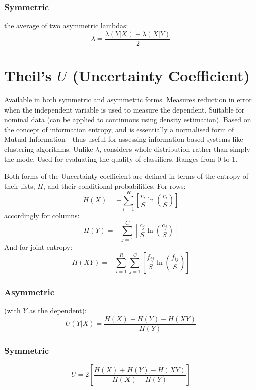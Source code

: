 \documentclass[11pt]{article}
\begin{document}
\subsubsection{Symmetric}
the average of two asymmetric lambdas:
$$
\lambda = \frac{ \lambda(Y|X) + \lambda(X|Y) }{ 2 }
$$


\section{Theil's $U$ (Uncertainty Coefficient)}
Available in both symmetric and asymmetric forms.  Measures reduction in error when the independent variable is used to measure the dependent.  Suitable for nominal data (can be applied to continuous using density estimation).  Based on the concept of information entropy, and is essentially a normalised form of Mutual Information---thus useful for assessing information based systems like clustering algorithms.  Unlike $\lambda$, considers whole distribution rather than simply the mode.  Used for evaluating the quality of classifiers.  Ranges from 0 to 1.

Both forms of the Uncertainty coefficient are defined in terms of the entropy of their lists, $H$, and their conditional probabilities.  For rows:
$$
H(X) = -\sum_{i=1}^{R}{ \left[ \frac{ r_i }{ S }       \ln \left( \frac{ r_i }{ S } \right) \right] }
$$
accordingly for columns:
$$
H(Y) = -\sum_{j=1}^{C}{ \left[ \frac{ c_j }{ S }       \ln \left( \frac{ c_j }{ S } \right) \right] }
$$
And for joint entropy:
$$
H(XY) = -\sum_{i=1}^{R}{  \sum_{j=1}^{C}{ \left[    \frac{ f_{ij} }{S}  \ln \left( \frac{ f_{ij} }{ S } \right)     \right] } }
$$

\subsubsection{Asymmetric}
(with $Y$ as the dependent):
$$
U(Y|X) = \frac{ H(X) + H(Y) - H(XY) }{ H(Y) }
$$

\subsubsection{Symmetric}
$$
U = 2 \left[ \frac{ H(X) + H(Y) - H(XY) }{ H(X) + H(Y) } \right]
$$
\end{document}
